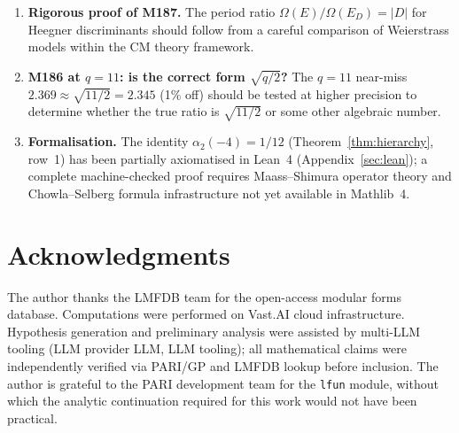 \documentclass[12pt]{amsart}
\theoremstyle{definition}
\newcommand{\Omega}{\varOmega}
\begin{document}
\begin{enumerate}
  \item \textbf{Rigorous proof of M187.}
    The period ratio $\Omega(E)/\Omega(E_D) = |D|$ for Heegner discriminants
    should follow from a careful comparison of Weierstrass models within
    the CM theory framework.

  \item \textbf{M186 at $q=11$: is the correct form $\sqrt{q/2}$?}
    The $q=11$ near-miss $2.369 \approx \sqrt{11/2} = 2.345$ (1\% off)
    should be tested at higher precision to determine whether the true ratio
    is $\sqrt{11/2}$ or some other algebraic number.

  \item \textbf{Formalisation.}
    The identity $\alpha_2(-4) = 1/12$ (Theorem~\ref{thm:hierarchy}, row~1)
    has been partially axiomatised in Lean~4 (Appendix~\ref{sec:lean});
    a complete machine-checked proof requires Maass--Shimura operator theory
    and Chowla--Selberg formula infrastructure not yet available in Mathlib~4.
\end{enumerate}

\section*{Acknowledgments}

The author thanks the LMFDB team for the open-access modular forms database.
Computations were performed on Vast.AI cloud infrastructure.
Hypothesis generation and preliminary analysis were assisted by multi-LLM
tooling (LLM provider LLM, LLM tooling); all mathematical claims
were independently verified via PARI/GP and LMFDB lookup before inclusion.
The author is grateful to the PARI development team for the \texttt{lfun}
module, without which the analytic continuation required for this work
would not have been practical.

\end{document}

